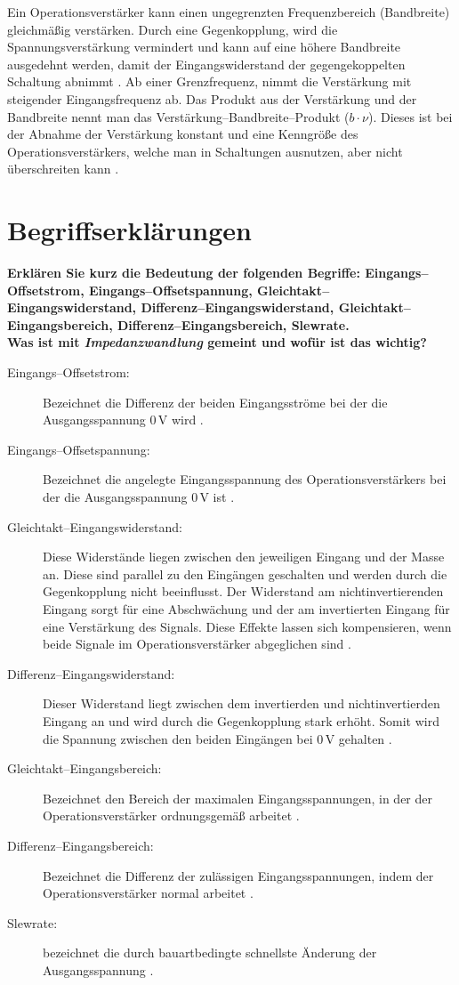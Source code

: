 Ein Operationsverstärker kann einen ungegrenzten Frequenzbereich (Bandbreite) gleichmäßig verstärken.
Durch eine Gegenkopplung, wird die Spannungsverstärkung vermindert und kann auf eine höhere Bandbreite ausgedehnt werden, damit der Eingangswiderstand der gegengekoppelten Schaltung abnimmt \citep[vgl.][S.206]{HBG}.
Ab einer Grenzfrequenz, nimmt die Verstärkung mit steigender Eingangsfrequenz ab.
Das Produkt aus der Verstärkung und der Bandbreite nennt man das Verstärkung–\-Bandbreite–Produkt (\(b\cdot\nu\)).
Dieses ist bei der Abnahme der Verstärkung konstant und eine Kenngröße des Operationsverstärkers, welche man in Schaltungen ausnutzen, aber nicht überschreiten kann \citep[vgl.][S.206]{HBG}.\newpage
\section{Begriffserklärungen}
\textbf{Erklären Sie kurz die Bedeutung der folgenden Begriffe: Eingangs–Offsetstrom,
Eingangs–Offsetspannung, Gleichtakt–Eingangswiderstand, Differenz–Eingangswiderstand, Gleichtakt–Eingangsbereich, Differenz–Eingangsbereich, Slewrate.\\
Was ist mit \textit{Impedanzwandlung} gemeint und wofür ist das wichtig?}
\begin{description}
    \item[Eingangs–Offsetstrom:] Bezeichnet die Differenz der beiden Eingangsströme bei der die Ausgangsspannung $0\,\text{V}$ wird \citep[vgl.][S.408]{HBG}.
    \item[Eingangs–Offsetspannung:] Bezeichnet die angelegte Eingangsspannung des Operationsverstärkers bei der die Ausgangsspannung $0\,\text{V}$ ist \citep[vgl.][S.408]{HBG}.
    \item[Gleichtakt–Eingangswiderstand:] Diese Widerstände liegen zwischen den jeweiligen Eingang und der Masse an. Diese sind parallel zu den Eingängen geschalten und werden durch die Gegenkopplung nicht beeinflusst. Der Widerstand am nichtinvertierenden Eingang sorgt für eine Abschwächung und der am invertierten Eingang für eine Verstärkung des Signals. Diese Effekte lassen sich kompensieren, wenn beide Signale im Operationsverstärker abgeglichen sind \citep[vgl.][]{wiki-op}.
    \item[Differenz–Eingangswiderstand:] Dieser Widerstand liegt zwischen dem invertierden und nichtinvertierden Eingang an und wird durch die Gegenkopplung stark erhöht. Somit wird die Spannung zwischen den beiden Eingängen bei $0\,\text{V}$ gehalten \citep[vgl.][]{wiki-op}.
    \item[Gleichtakt–Eingangsbereich:] Bezeichnet den Bereich der maximalen Eingangsspannungen, in der der Operationsverstärker ordnungsgemäß arbeitet \citep[vgl.][]{ees}.
    \item[Differenz–Eingangsbereich:] Bezeichnet die Differenz der zulässigen Eingangsspannungen, indem der Operationsverstärker normal arbeitet \citep[vgl.][]{ees}.
    \item[Slewrate:] bezeichnet die durch bauartbedingte schnellste Änderung der Ausgangsspannung \citep[vgl.][S. 409]{HBG}.
\end{description}
